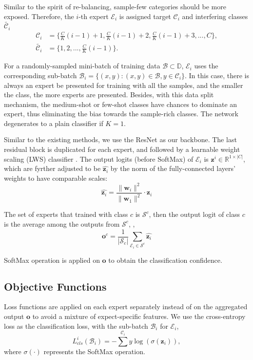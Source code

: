 Similar to the spirit of re-balancing, sample-few categories should be more exposed. Therefore, the $i$-th expert $\mathcal{E}_i$ is assigned target $\mathcal{C}_i $ and interfering classes $\widetilde {\mathcal{C}_i}$
\begin{equation}
     \begin{aligned}
        \mathcal{C}_i &=\{\frac{C}{K}(i-1)+1,\frac{C}{K}(i-1)+2, \frac{C}{K}(i-1)+3, ..., C \}, \\ 
        \widetilde {\mathcal{C}_i} &=\{1, 2, ...,\frac{C}{K}(i-1)\}.   
    \end{aligned}
\end{equation}

For a randomly-sampled mini-batch of training data $\mathcal{B} \subset \mathbb{D}$, $\mathcal{E}_i$ uses the corresponding sub-batch $\mathcal{B}_i=\{(x,y): (x,y) \in \mathcal{B}, y \in \mathcal{C}_i\}$. In this case, there is always an expert be presented for training with all the samples, and the smaller the class, the more experts are presented. Besides, with this data split mechanism, the medium-shot or few-shot classes have chances to dominate an expert, thus eliminating the bias towards the sample-rich classes. The network degenerates to a plain classifier if $K=1$. 

Similar to the existing methods, we use the ResNet \cite{he2016deep} as our backbone. The last residual block is duplicated for each expert, and followed by a learnable weight scaling (LWS) classifier \cite{kang2019decoupling}. The output logits (before SoftMax) of $\mathcal{E}_i$ is $\textbf{z}^{i} \in \mathbb{R}^{1\times|C|}$, which are fyrther adjusted to be $\hat{\textbf{z}_i}$ by the norm of the fully-connected layers' weights to have comparable scales: 
\begin{equation}
     \hat{\textbf{z}_i} = \frac{\|\textbf{w}_i\|^2}{\|\textbf{w}_1\|^2} \cdot \textbf{z}_i 
\end{equation}

The set of experts that trained with class $c$ is $\mathcal{S}^c$, then the output logit of class $c$ is the average among the outputs from $\mathcal{S}^c$, \ie, 
\begin{equation}
     \textbf{o}^c = \frac{1}{|\mathcal{S}_c|} \sum_{\mathcal{E}_i \in \mathcal{S}^c}\hat{\textbf{z}_i}
\end{equation}

SoftMax operation is applied on $\textbf{o}$ to obtain the classification confidence.

\subsection{Objective Functions}
Loss functions are applied on each expert separately instead of on the aggregated output $\textbf{o}$ to avoid a mixture of expect-specific features. We use the cross-entropy loss as the classification loss, with the sub-batch $\mathcal{B}_i$ for $\mathcal{E}_i$,
\begin{equation}
    L_{cls}^i(\mathcal{B}_i)=-\sum ^{\mathcal{C}_i}y\log(\sigma(\textbf{z}_i)), 
\end{equation}
where $\sigma (\cdot)$ represents the SoftMax operation.

